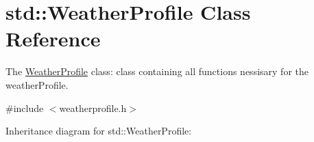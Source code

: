 \hypertarget{classstd_1_1WeatherProfile}{}\section{std\+:\+:Weather\+Profile Class Reference}
\label{classstd_1_1WeatherProfile}


The \hyperlink{classstd_1_1WeatherProfile}{Weather\+Profile} class\+: class containing all functions nessisary for the weather\+Profile.  




{\ttfamily \#include $<$weatherprofile.\+h$>$}



Inheritance diagram for std\+:\+:Weather\+Profile\+:
